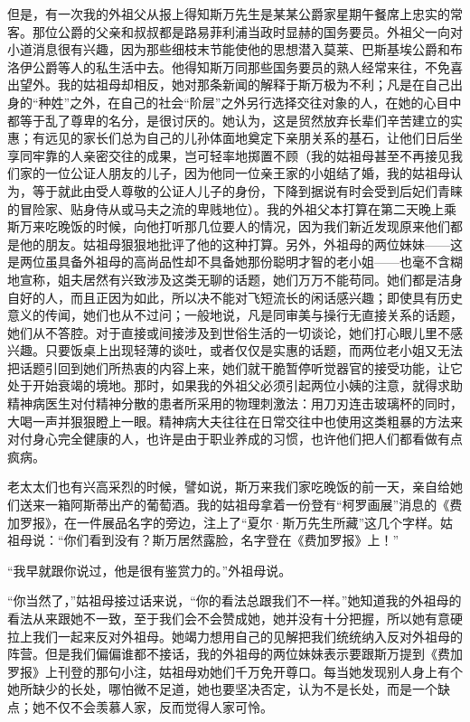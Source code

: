 \par 但是，有一次我的外祖父从报上得知斯万先生是某某公爵家星期午餐席上忠实的常客。那位公爵的父亲和叔叔都是路易菲利浦当政时显赫的国务要员。外祖父一向对小道消息很有兴趣，因为那些细枝末节能使他的思想潜入莫莱、巴斯基埃公爵和布洛伊公爵等人的私生活中去。他得知斯万同那些国务要员的熟人经常来往，不免喜出望外。我的姑祖母却相反，她对那条新闻的解释于斯万极为不利；凡是在自己出身的“种姓”之外，在自己的社会“阶层”之外另行选择交往对象的人，在她的心目中都等于乱了尊卑的名分，是很讨厌的。她认为，这是贸然放弃长辈们辛苦建立的实惠；有远见的家长们总为自己的儿孙体面地奠定下亲朋关系的基石，让他们日后坐享同牢靠的人亲密交往的成果，岂可轻率地掷置不顾（我的姑祖母甚至不再接见我们家的一位公证人朋友的儿子，因为他同一位亲王家的小姐结了婚，我的姑祖母认为，等于就此由受人尊敬的公证人儿子的身份，下降到据说有时会受到后妃们青睐的冒险家、贴身侍从或马夫之流的卑贱地位）。我的外祖父本打算在第二天晚上乘斯万来吃晚饭的时候，向他打听那几位要人的情况，因为我们新近发现原来他们都是他的朋友。姑祖母狠狠地批评了他的这种打算。另外，外祖母的两位妹妹——这是两位虽具备外祖母的高尚品性却不具备她那份聪明才智的老小姐——也毫不含糊地宣称，姐夫居然有兴致涉及这类无聊的话题，她们万万不能苟同。她们都是洁身自好的人，而且正因为如此，所以决不能对飞短流长的闲话感兴趣；即使具有历史意义的传闻，她们也从不过问；一般地说，凡是同审美与操行无直接关系的话题，她们从不答腔。对于直接或间接涉及到世俗生活的一切谈论，她们打心眼儿里不感兴趣。只要饭桌上出现轻薄的谈吐，或者仅仅是实惠的话题，而两位老小姐又无法把话题引回到她们所热衷的内容上来，她们就干脆暂停听觉器官的接受功能，让它处于开始衰竭的境地。那时，如果我的外祖父必须引起两位小姨的注意，就得求助精神病医生对付精神分散的患者所采用的物理刺激法：用刀刃连击玻璃杯的同时，大喝一声并狠狠瞪上一眼。精神病大夫往往在日常交往中也使用这类粗暴的方法来对付身心完全健康的人，也许是由于职业养成的习惯，也许他们把人们都看做有点疯病。
\par 老太太们也有兴高采烈的时候，譬如说，斯万来我们家吃晚饭的前一天，亲自给她们送来一箱阿斯蒂出产的葡萄酒。我的姑祖母拿着一份登有“柯罗画展”消息的《费加罗报》，在一件展品名字的旁边，注上了“夏尔·斯万先生所藏”这几个字样。姑祖母说：“你们看到没有？斯万居然露脸，名字登在《费加罗报》上！”
\par “我早就跟你说过，他是很有鉴赏力的。”外祖母说。
\par “你当然了，”姑祖母接过话来说，“你的看法总跟我们不一样。”她知道我的外祖母的看法从来跟她不一致，至于我们会不会赞成她，她并没有十分把握，所以她有意硬拉上我们一起来反对外祖母。她竭力想用自己的见解把我们统统纳入反对外祖母的阵营。但是我们偏偏谁都不接话，我的外祖母的两位妹妹表示要跟斯万提到《费加罗报》上刊登的那句小注，姑祖母劝她们千万免开尊口。每当她发现别人身上有个她所缺少的长处，哪怕微不足道，她也要坚决否定，认为不是长处，而是一个缺点；她不仅不会羡慕人家，反而觉得人家可怜。

